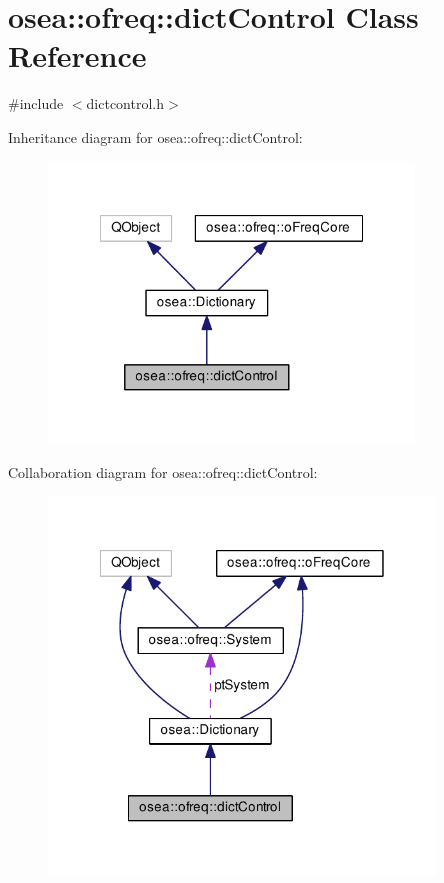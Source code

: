 \hypertarget{classosea_1_1ofreq_1_1dict_control}{\section{osea\-:\-:ofreq\-:\-:dict\-Control Class Reference}
\label{classosea_1_1ofreq_1_1dict_control}
}


{\ttfamily \#include $<$dictcontrol.\-h$>$}



Inheritance diagram for osea\-:\-:ofreq\-:\-:dict\-Control\-:
\nopagebreak
\begin{figure}[H]
\begin{center}
\leavevmode
\includegraphics[width=275pt]{classosea_1_1ofreq_1_1dict_control__inherit__graph}
\end{center}
\end{figure}


Collaboration diagram for osea\-:\-:ofreq\-:\-:dict\-Control\-:
\nopagebreak
\begin{figure}[H]
\begin{center}
\leavevmode
\includegraphics[width=291pt]{classosea_1_1ofreq_1_1dict_control__coll__graph}
\end{center}
\end{figure}
